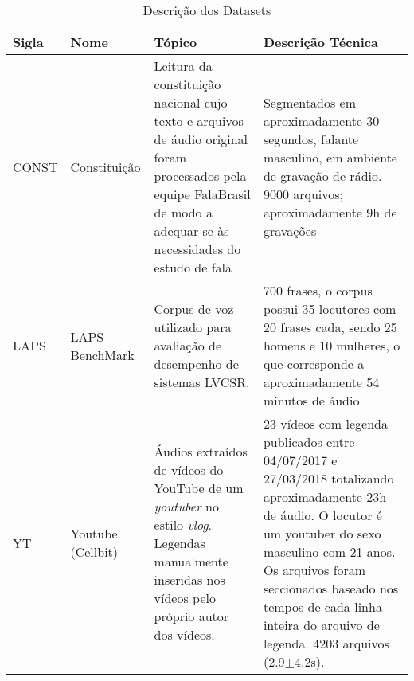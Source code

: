 \documentclass{article}
\begin{document}
\begin{center}
	\begin{table}[h!]
		\begin{tabular}{p{1cm}p{2cm}p{5cm}p{6cm}}
			\hline
			Sigla & Nome              & Tópico& Descrição Técnica\\ 
			\hline
			\hypertarget{CONST}{CONST} & Constituição      & Leitura da constituição nacional cujo texto e arquivos de áudio original foram processados pela equipe FalaBrasil de modo a adequar-se às necessidades do estudo de fala                          & Segmentados em aproximadamente 30 segundos, falante masculino, em ambiente de gravação de rádio. 9000 arquivos; aproximadamente 9h de gravações\\
			\hline
			\hypertarget{LAPS}{LAPS}  & LAPS BenchMark    & Corpus de voz utilizado para avaliação de desempenho de sistemas LVCSR.& 700 frases, o corpus possui 35 locutores com 20 frases cada, sendo 25 homens e 10 mulheres, o que corresponde a aproximadamente 54 minutos de áudio\\ 
			\hline
			\hypertarget{YT}{YT}    & Youtube (Cellbit) & Áudios extraídos de vídeos do YouTube de um \textit{youtuber} no estilo \textit{vlog}. Legendas manualmente inseridas nos vídeos pelo próprio autor dos vídeos. & 23 vídeos com legenda publicados entre 04/07/2017 e 27/03/2018 totalizando aproximadamente 23h de áudio. O locutor é um youtuber do sexo masculino com 21 anos. Os arquivos foram seccionados baseado nos tempos de cada linha inteira do arquivo de legenda. 4203 arquivos (2.9$\pm$4.2s). \\ 
			\hline
		\end{tabular}
		\caption{Descrição dos Datasets}
		\label{tab:datasets}
	\end{table}
\end{center}
\end{document}
